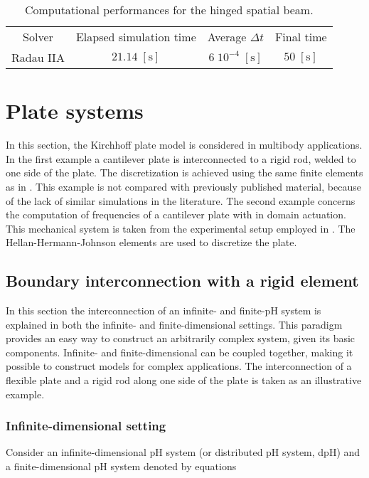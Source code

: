 \begin{table}[tb]
	\centering
	\caption{Computational performances for the hinged spatial beam.}
	\label{tab:comp_perf_hinged}       %
	\begin{tabular}{cccc}
		\hline\noalign{\smallskip}
		Solver & Elapsed simulation time & Average $\Delta t$ &  Final time \\
		\noalign{\smallskip}\hline\noalign{\smallskip}
		Radau IIA & $21.14\; \mathrm{[s]}$ & $6 \; 10^{-4} \; \mathrm{[s]}$ & $50 \; \mathrm{[s]}$ \\
		\hline
	\end{tabular}
\end{table}


\section{Plate systems}
In this section, the Kirchhoff plate model is considered in multibody applications. In the first example a cantilever plate is interconnected to a rigid rod, welded to one side of the plate. The discretization is achieved using the same finite elements as in . This example is not compared with previously published material, because of the lack of similar simulations in the literature. The second example concerns the computation of frequencies of a cantilever plate with in domain actuation. This mechanical system is taken from the experimental setup employed in \cite{preda2020}. The Hellan-Hermann-Johnson elements are used to discretize the plate.

\subsection{Boundary interconnection with a rigid element}
In this section the interconnection of an infinite- and finite-pH system is explained in both the infinite- and finite-dimensional settings. This paradigm provides an easy way to construct an arbitrarily complex system, given its basic components. Infinite- and finite-dimensional can be coupled together, making it possible to construct models for complex applications. The interconnection of a flexible plate and a rigid rod along one side of the plate is taken as an illustrative example.

\subsubsection{Infinite-dimensional setting}
Consider an infinite-dimensional pH system (or distributed pH system, dpH) and a finite-dimensional pH system denoted by equations 

